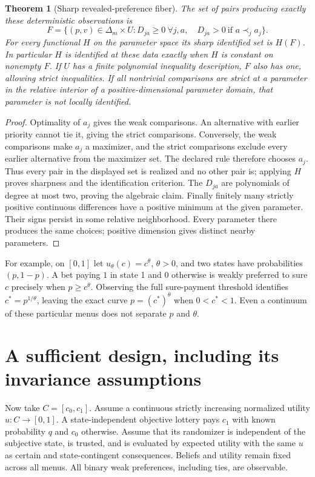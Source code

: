 \documentclass[11pt]{article}
\newtheorem{theorem}{Theorem}
\theoremstyle{remark}
\begin{document}
\begin{theorem}[Sharp revealed-preference fiber]
The set of pairs producing exactly these deterministic observations is
\[
 F=\{(p,v)\in\Delta_m\times U:
 D_{ja}\geq0\ \forall j,a,\quad
 D_{ja}>0\ \text{if }a\prec_j a_j\}.
\]
For every functional $H$ on the parameter space its sharp identified set
is $H(F)$. In particular $H$ is identified at these data exactly when
$H$ is constant on nonempty $F$. If $U$ has a finite polynomial inequality
description, $F$ also has one, allowing strict inequalities.
If all nontrivial comparisons are strict at a parameter in the relative
interior of a positive-dimensional parameter domain, that parameter is
not locally identified.
\end{theorem}
\begin{proof}
Optimality of $a_j$ gives the weak comparisons. An alternative with earlier
priority cannot tie it, giving the strict comparisons. Conversely, the
weak comparisons make $a_j$ a maximizer, and the strict comparisons exclude
every earlier alternative from the maximizer set. The declared rule therefore
chooses $a_j$. Thus every pair in the displayed set is realized and no other
pair is; applying $H$ proves sharpness and the identification criterion.
The $D_{ja}$ are polynomials of degree at most two, proving the algebraic
claim. Finally finitely many strictly positive continuous differences have
a positive minimum at the given parameter. Their signs persist in some
relative neighborhood. Every parameter there produces the same choices;
positive dimension gives distinct nearby parameters.
\end{proof}

For example, on $[0,1]$ let $u_\theta(c)=c^\theta$, $\theta>0$, and two
states have probabilities $(p,1-p)$. A bet paying $1$ in state 1 and $0$
otherwise is weakly preferred to sure $c$ precisely when $p\geq c^\theta$.
Observing the full sure-payment threshold identifies
$c^*=p^{1/\theta}$, leaving the exact curve $p=(c^*)^\theta$ when
$0<c^*<1$. Even a continuum of these particular menus does not separate
$p$ and $\theta$.

\section{A sufficient design, including its invariance assumptions}
Now take $C=[c_0,c_1]$. Assume a continuous strictly increasing normalized
utility $u:C\to[0,1]$. A state-independent objective lottery pays $c_1$
with known probability $q$ and $c_0$ otherwise. Assume that its randomizer
is independent of the subjective state, is trusted, and is evaluated by
expected utility with the same $u$ as certain and state-contingent
consequences. Beliefs and utility remain fixed across all menus. All binary
weak preferences, including ties, are observable.
\end{document}
